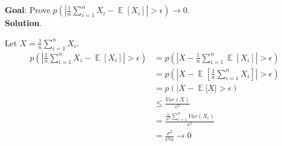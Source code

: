 \documentclass[11pt]{article}
\newcommand{\exercise}{\section{}}
\DeclareMathOperator{\E}{\mathbb{E}}
\newcommand{\sumf}[3]{\sum_{#1}^{#2} #3}
\begin{document}
\exercise

\textbf{Goal}: Prove $p(|\frac{1}{n} \sumf{i=1}{n}{X_i - \E[X_i]}| > \epsilon) \rightarrow 0$. \\
\noindent \textbf{Solution}.

\noindent Let $X = \frac{1}{n} \sumf{i=1}{n}{X_i}$.
\begin{align*}
p(|\frac{1}{n} \sumf{i=1}{n}{X_i - \E[X_i]}| > \epsilon)  &= p(| X - \frac{1}{n} \sumf{i=1}{n}{\E[X_i]}| > \epsilon) \tag{linearity of expectation} \\
&= p(| X - \E[\frac{1}{n} \sumf{i=1}{n}{X_i]}| > \epsilon) \tag{by substitution} \\
&= p(| X - \E[X| > \epsilon) \tag{by Chebyshev inequality} \\
&\le \frac{Var(X)}{\epsilon^2} \tag{by linearity of variance under i.i.d assumption} \\
&= \frac{\frac{1}{n^2} \sumf{i=1}{n}{Var(X_i)}}{\epsilon^2} \tag{$X_i$ have same variance  $\sigma^2$} \\
&= \frac{\sigma^2}{\epsilon^2 n} \rightarrow 0 \tag{$n \rightarrow \infty$}
\end{align*}
\end{document}
